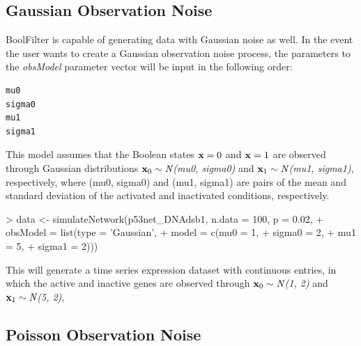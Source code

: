 \documentclass[a4paper]{article}
\theoremstyle{plain}
\theoremstyle{definition}
\theoremstyle{remark}
\def\N{{\bf \textit{N}}}
\def\xone{{\bf{x}}_{1}}
\def\xzero{{\bf{x}}_{0}}
\def\x{{\bf x}}
\begin{document}
\begin{Schunk}
\end{Schunk}

\subsection{Gaussian Observation Noise}

BoolFilter is capable of generating data with Gaussian noise as well. In the event the user wants to create a Gaussian observation noise process, the parameters to the \textit{obsModel} parameter vector will be input in the following order:

\begin{verbatim}
mu0
sigma0
mu1
sigma1
\end{verbatim}


This model assumes that the Boolean states $\x = 0$ and $\x = 1$ are observed through Gaussian distributions $\xzero \sim \N$\textit{(mu0, sigma0)} and $\xone \sim \N$\textit{(mu1, sigma1)}, respectively, where {(mu0, sigma0)} and {(mu1, sigma1)} are pairs of the mean and standard deviation of the activated and inactivated conditions, respectively.


\begin{Schunk}
\begin{Sinput}
> data <- simulateNetwork(p53net_DNAdsb1, n.data = 100, p = 0.02,
+                       obsModel = list(type = 'Gaussian',
+                                       model = c(mu0 = 1, 
+                                              sigma0 = 2, 
+                                                 mu1 = 5, 
+                                             sigma1 = 2)))
\end{Sinput}
\end{Schunk}

This will generate a time series expression dataset with continuous entries,  in which the active and inactive genes are observed through $\xzero \sim \N$\textit{(1, 2)} and $\xone \sim \N$\textit{(5, 2)},

\subsection{Poisson Observation Noise}
\end{document}
